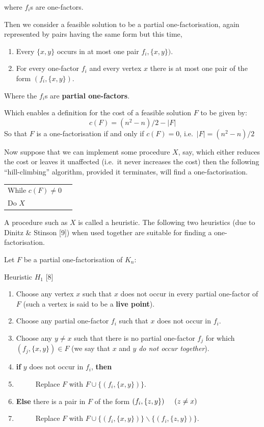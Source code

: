 \documentclass[
  12pt,
  a4paper]{book}
\begin{document}
where \(f_i\)s are one-factors.

Then we consider a feasible solution to be a partial one-factorisation,
again represented by pairs having the same form but this time,

\begin{enumerate}
\def\labelenumi{\arabic{enumi}.}
\item
  Every \(\{x,y\}\) occurs in at most one pair \(f_i,\{x,y\})\).
\item
  For every one-factor \(f_i\) and every vertex \(x\) there is at most one
  pair of the form \((f_i,\{x,y\})\).
\end{enumerate}

Where the \(f_i\)s are \textbf{partial one-factors}.

Which enables a definition for the cost of a feasible solution \(F\) to be
given by: \[c(F) = (n^2-n)/2-|F|\] So that \(F\) is a one-factorisation if
and only if \(c(F)=0\), i.e.~\(|F|=(n^2-n)/2\)

Now suppose that we can implement some procedure \(X\), say, which either
reduces the cost or leaves it unaffected (i.e.~it never increases the
cost) then the following ``hill-climbing'' algorithm, provided it
terminates, will find a one-factorisation.

\begin{longtable}[]{@{}ll@{}}
\toprule
\endhead
While \(c(F) \neq 0\) &\tabularnewline
Do \(X\) &\tabularnewline
\bottomrule
\end{longtable}

A procedure such as \(X\) is called a heuristic. The following two
heuristics (due to Dinitz \& Stinson {[}9{]}) when used together are suitable
for finding a one-factorisation.

Let \(F\) be a partial one-factorisation of \(K_n\):

Heuristic \(H_1\) {[}8{]}

\begin{enumerate}
\def\labelenumi{\arabic{enumi}.}
\item
  Choose any vertex \(x\) such that \(x\) does not occur in every partial
  one-factor of \(F\) (such a vertex is said to be a \textbf{live point}).
\item
  Choose any partial one-factor \(f_i\) such that \(x\) does not occur in
  \(f_i\).
\item
  Choose any \(y \neq x\) such that there is no partial one-factor \(f_j\)
  for which \((f_j,\{x,y\}) \in F\) (we say that \(x\) and \(y\) \emph{do not
  occur together}).
\item
  \textbf{if} \(y\) does not occur in \(f_i\), \textbf{then}
\item
  \(\hspace{1cm}\) Replace \(F\) with \(F \cup \{(f_i,\{x,y\})\}\).
\item
  \textbf{Else} there is a pair in \(F\) of the form
  \((f_i,\{z,y\}) \hspace{0.5cm} (z \neq x)\)
\item
  \(\hspace{1cm}\) Replace \(F\) with \(F \cup \{(f_i,\{x,y\})\} \backslash  \{(f_i,\{z,y\})\}\).
\end{enumerate}
\end{document}
